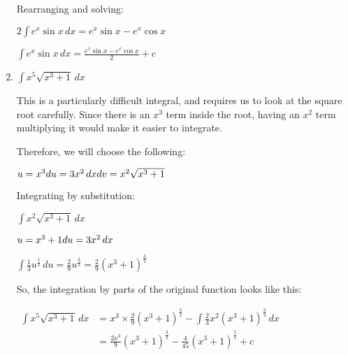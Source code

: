 \documentclass[../main.tex]{subfiles}
\begin{document}
\begin{enumerate}
    Rearranging and solving:

    \(2\int e^x \sin{x}\, dx=e^x\sin{x}-e^x\cos{x}\)

    \(\int e^x \sin{x}\, dx=\frac{e^x\sin{x}-e^x\cos{x}}{2}+c\)
    
    \item \(\int x^5 \sqrt{x^3+1}\, dx\) 
    
    This is a particularly difficult integral, and requires us to look at the square root carefully. Since there is an \(x^3\) term inside the root, having an \(x^2\) term multiplying it would make it easier to integrate.
    
    Therefore, we will choose the following:

    \(u=x^3\\
    du=3x^2\,dx\\
    dv=x^2\sqrt{x^3+1}\)

    Integrating by substitution:

    \(\int x^2 \sqrt{x^3+1}\, dx\) 

    \(u=x^3+1\\
    du=3x^2\,dx\)

    \(\int \frac{1}{3}u^{\frac{1}{2}}\,du=\frac{2}{9}u^{\frac{3}{2}}=\frac{2}{9}(x^3+1)^{\frac{3}{2}}\)

    So, the integration by parts of the original function looks like this:
    
    $
    \!
    \begin{aligned}
        \int x^5 \sqrt{x^3+1}\, dx
        &=x^3\times \frac{2}{9}(x^3+1)^{\frac{3}{2}}-\int \frac{2}{3}x^2(x^3+1)^{\frac{3}{2}}\,dx\\
        &=\frac{2x^3}{9}(x^3+1)^{\frac{3}{2}}-\frac{4}{45}(x^3+1)^{\frac{5}{2}}+c
    \end{aligned}$

    
\end{enumerate}
\end{document}
